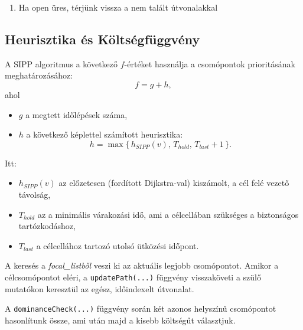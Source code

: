 \documentclass[a4paper,12pt]{article}
\begin{document}
\begin{enumerate}
\begin{itemize}
\begin{itemize}
\begin{itemize}
\begin{itemize}
\begin{itemize}
                                        \item $n'.g \gets t'$
                                        \item $n'.f \gets n'.g + n'.h$
                                        \item $\text{open}.\text{update}(n')$
                                    \end{itemize}
                            \end{itemize}
                    \end{itemize}
            \end{itemize}
    \end{itemize}

    \item Ha $\text{open}$ üres, térjünk vissza a nem talált útvonalakkal
\end{enumerate}

\subsection{Heurisztika és Költségfüggvény}

A SIPP algoritmus a következő $f$-értéket használja a csomópontok prioritásának meghatározásához:
\[
f = g + h,
\]
ahol
\begin{itemize}[label=\textbullet]
    \item $g$ a megtett időlépések száma,
    \item $h$ a következő képlettel számított heurisztika:
    \[
    h = \max\Big\{\, h_{SIPP}(v),\, T_{hold},\, T_{last}+1 \,\Big\}.
    \]
\end{itemize}
Itt:
\begin{itemize}[label=\textbullet]
    \item $h_{SIPP}(v)$ az előzetesen (fordított Dijkstra-val) kiszámolt, a cél felé vezető távolság,
    \item $T_{hold}$ az a minimális várakozási idő, ami a célcellában szükséges a biztonságos tartózkodáshoz,
    \item $T_{last}$ a célcellához tartozó utolsó ütközési időpont.
\end{itemize}

A keresés a \emph{focal\_listből} veszi ki az aktuális legjobb csomópontot. Amikor a célcsomópontot eléri, a \texttt{updatePath(...)} függvény visszaköveti a szülő mutatókon keresztül az egész, időindexelt útvonalat.

A \texttt{dominanceCheck(...)} függvény során két azonos helyszínű csomópontot hasonlítunk össze, ami után majd a kisebb költségűt választjuk. 
\end{document}
